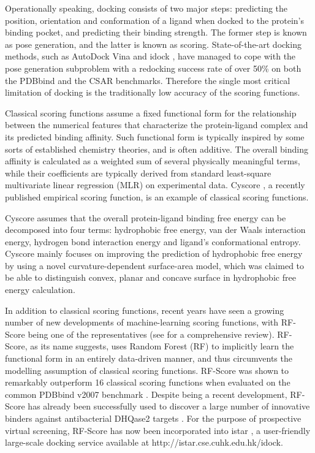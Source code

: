 \documentclass[journal=jacsat,manuscript=article]{achemso}
\begin{document}
Operationally speaking, docking consists of two major steps: predicting the position, orientation and conformation of a ligand when docked to the protein's binding pocket, and predicting their binding strength. The former step is known as pose generation, and the latter is known as scoring. State-of-the-art docking methods, such as AutoDock Vina \cite{595} and idock \cite{1153}, have managed to cope with the pose generation subproblem with a redocking success rate of over 50\% \cite{1362} on both the PDBbind \cite{529,530} and the CSAR \cite{857,960} benchmarks. Therefore the single most critical limitation of docking is the traditionally low accuracy of the scoring functions.

Classical scoring functions assume a fixed functional form for the relationship between the numerical features that characterize the protein-ligand complex and its predicted binding affinity. Such functional form is typically inspired by some sorts of established chemistry theories, and is often additive. The overall binding affinity is calculated as a weighted sum of several physically meaningful terms, while their coefficients are typically derived from standard least-square multivariate linear regression (MLR) on experimental data. Cyscore \cite{1372}, a recently published empirical scoring function, is an example of classical scoring functions.

Cyscore assumes that the overall protein-ligand binding free energy can be decomposed into four terms: hydrophobic free energy, van der Waals interaction energy, hydrogen bond interaction energy and ligand's conformational entropy. Cyscore mainly focuses on improving the prediction of hydrophobic free energy by using a novel curvature-dependent surface-area model, which was claimed to be able to distinguish convex, planar and concave surface in hydrophobic free energy calculation.

In addition to classical scoring functions, recent years have seen a growing number of new developments of machine-learning scoring functions, with RF-Score \cite{564} being one of the representatives (see \cite{1373} for a comprehensive review). RF-Score, as its name suggests, uses Random Forest (RF) \cite{1309} to implicitly learn the functional form in an entirely data-driven manner, and thus circumvents the modelling assumption of classical scoring functions. RF-Score was shown to remarkably outperform 16 classical scoring functions when evaluated on the common PDBbind v2007 benchmark \cite{564}. Despite being a recent development, RF-Score has already been successfully used to discover a large number of innovative binders against antibacterial DHQase2 targets \cite{1281}. For the purpose of prospective virtual screening, RF-Score has now been incorporated into istar \cite{1362}, a user-friendly large-scale docking service available at http://istar.cse.cuhk.edu.hk/idock.
\end{document}
